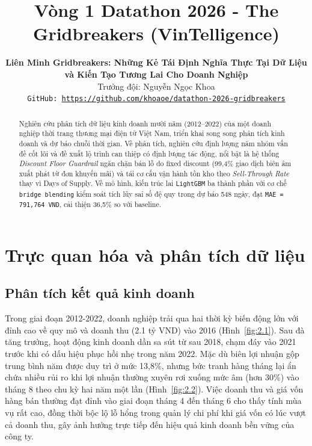 \documentclass{article}
\title{%
  Vòng 1 Datathon 2026 - The Gridbreakers (VinTelligence)
}
\author{%
  \textbf{Liên Minh Gridbreakers: Những Kẻ Tái Định Nghĩa Thực Tại Dữ Liệu}\\
  \textbf{và Kiến Tạo Tương Lai Cho Doanh Nghiệp}\\
  Trưởng đội: Nguyễn Ngọc Khoa\\
  \texttt{GitHub: \url{https://github.com/khoaoe/datathon-2026-gridbreakers}}
}
\begin{document}
\maketitle

\begin{abstract}
Nghiên cứu phân tích dữ liệu kinh doanh mười năm (2012--2022) của một doanh nghiệp thời trang thương mại điện tử Việt Nam, triển khai song song phân tích kinh doanh và dự báo chuỗi thời gian. Về phân tích, nghiên cứu định lượng năm nhóm vấn đề cốt lõi và đề xuất lộ trình can thiệp có định lượng tác động, nổi bật là hệ thống \textit{Discount Floor Guardrail} ngăn chặn bán lỗ do fixed discount (99,4\% giao dịch biên âm xuất phát từ đơn khuyến mãi) và tái cơ cấu vận hành tồn kho theo \textit{Sell-Through Rate} thay vì Days of Supply. Về mô hình, kiến trúc lai \texttt{LightGBM} ba thành phần với cơ chế \texttt{bridge blending} kiểm soát tích lũy sai số đệ quy trong dự báo 548 ngày, đạt \texttt{MAE = 791{,}764 VND}, cải thiện 36,5\% so với baseline.
\end{abstract}


\section{Trực quan hóa và phân tích dữ liệu}
\label{sec:eda}
\subsection{Phân tích kết quả kinh doanh}
Trong giai đoạn 2012-2022, doanh nghiệp trải qua hai thời kỳ biến động lớn với đỉnh cao về quy mô và doanh thu (2.1 tỷ VND) vào 2016 (Hình~\ref{fig:2.1}). Sau đà tăng trưởng, hoạt động kinh doanh dần sa sút từ sau 2018, chạm đáy vào 2021 trước khi có dấu hiệu phục hồi nhẹ trong năm 2022. Mặc dù biên lợi nhuận gộp trung bình năm được duy trì ở mức 13,8\%, nhưng bức tranh hàng tháng lại ẩn chứa nhiều rủi ro khi lợi nhuận thường xuyên rơi xuống mức âm (hơn 30\%) vào tháng 8 theo chu kỳ hai năm một lần (Hình~\ref{fig:2.2}). Việc doanh thu và giá vốn hàng bán thường đạt đỉnh vào giai đoạn tháng 4 đến tháng 6 cho thấy tính mùa vụ rất cao, đồng thời bộc lộ lỗ hổng trong quản lý chi phí khi giá vốn có lúc vượt cả doanh thu, gây ảnh hưởng trực tiếp đến hiệu quả kinh doanh bền vững của công ty.
\end{document}
